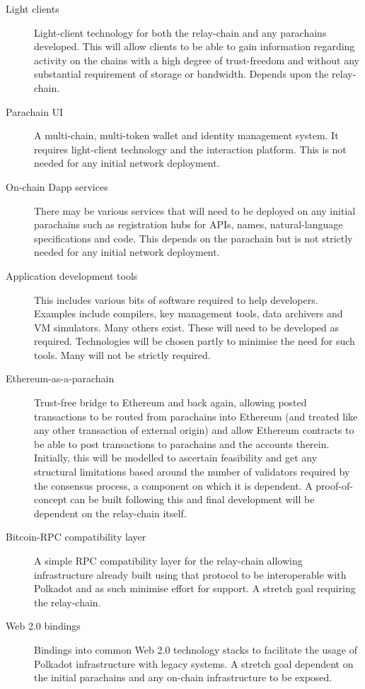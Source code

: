 \documentclass[t,usepdftitle=false]{beamer}
\begin{document}
\begin{frame}
\begin{description}
\item[Light clients] Light-client technology for both the relay-chain and any parachains developed. This will allow clients to be able to gain information regarding activity on the chains with a high degree of trust-freedom and without any substantial requirement of storage or bandwidth. Depends upon the relay-chain.

\item[Parachain UI] A multi-chain, multi-token wallet and identity management system. It requires light-client technology and the interaction platform. This is not needed for any initial network deployment.

\item[On-chain Dapp services] There may be various services that will need to be deployed on any initial parachains such as registration hubs for APIs, names, natural-language specifications and code. This depends on the parachain but is not strictly needed for any initial network deployment.

\item[Application development tools] This includes various bits of software required to help developers. Examples include compilers, key management tools, data archivers and VM simulators. Many others exist. These will need to be developed as required. Technologies will be chosen partly to minimise the need for such tools. Many will not be strictly required.

\item[Ethereum-as-a-parachain] Trust-free bridge to Ethereum and back again, allowing posted transactions to be routed from parachains into Ethereum (and treated like any other transaction of external origin) and allow Ethereum contracts to be able to post transactions to parachains and the accounts therein. Initially, this will be modelled to ascertain feasibility and get any structural limitations based around the number of validators required by the consensus process, a component on which it is dependent. A proof-of-concept can be built following this and final development will be dependent on the relay-chain itself.

\item[Bitcoin-RPC compatibility layer] A simple RPC compatibility layer for the relay-chain allowing infrastructure already built using that protocol to be interoperable with Polkadot and as such minimise effort for support. A stretch goal requiring the relay-chain.

\item[Web 2.0 bindings] Bindings into common Web 2.0 technology stacks to facilitate the usage of Polkadot infrastructure with legacy systems. A stretch goal dependent on the initial parachains and any on-chain infrastructure to be exposed.


\end{description}
\end{frame}
\end{document}

